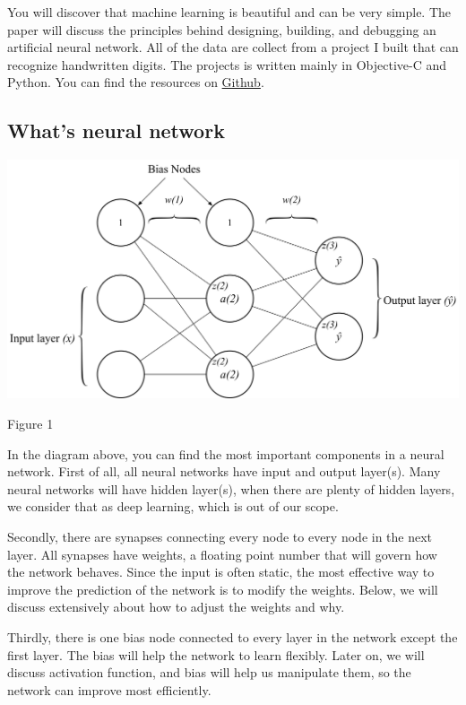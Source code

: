 \documentclass[]{article}
\begin{document}
\begin{multicols}{2}
You will discover that machine learning is beautiful and can be very
simple. The paper will discuss the principles behind designing, building, and
debugging an artificial neural network. All of the data are collect from a project I built that can recognize handwritten digits. The projects is written mainly in Objective-C and Python. You can find the resources on
\href{https://github.com/NeilNie/Neural-Network-Research}{Github}.

\subsection{What's neural network}

\centerline{\includegraphics[width=1\linewidth]{nn} }
\centerline{Figure 1}
\vspace{0.5cm}

In the diagram above, you can find the most important components in a neural network. First of all, all neural networks have input and output layer(s). Many neural networks will have hidden layer(s), when there are plenty of hidden layers, we consider that as deep learning, which is out of our scope. 

Secondly, there are synapses connecting every node to every node in the next layer. All synapses have weights, a floating point number that will govern how the network behaves. Since the input is often static, the most effective way to improve the prediction of the network is to modify the weights. Below, we will discuss extensively about how to adjust the weights and why. 

Thirdly, there is one bias node connected to every layer in the network except the first layer. The bias will help the network to learn flexibly. Later on, we will discuss activation function, and bias will help us manipulate them, so the network can improve most efficiently. 


\end{multicols}
\end{document}
